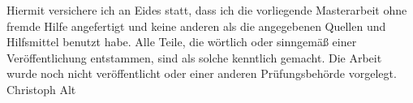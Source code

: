 \noindent
Hiermit versichere ich an Eides statt, dass ich die vorliegende Masterarbeit ohne fremde Hilfe angefertigt und keine anderen als die angegebenen Quellen und Hilfsmittel benutzt habe. Alle Teile, die w\"ortlich oder sinngem\"a\ss{} einer Ver\"offentlichung entstammen, sind als solche kenntlich gemacht. Die Arbeit wurde noch nicht ver\"offentlicht oder einer anderen Pr\"ufungsbeh\"orde vorgelegt. \\
\bigbreak
\noindent
Christoph Alt
